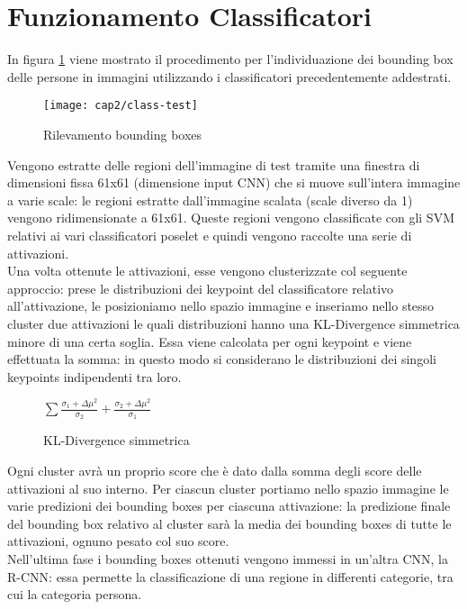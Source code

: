 \section{Funzionamento Classificatori}
In figura \ref{class-test} viene mostrato il procedimento per l'individuazione dei bounding box delle persone in immagini utilizzando i classificatori precedentemente addestrati.

\begin{figure}[h]
\centering
\texttt{[image: cap2/class-test]}
\caption{Rilevamento bounding boxes}
\label{class-test}
\end{figure}

Vengono estratte delle regioni dell'immagine di test tramite una finestra di dimensioni fissa 61x61 (dimensione input CNN) che si muove sull'intera immagine a varie scale: le regioni estratte dall'immagine scalata (scale diverso da 1) vengono ridimensionate a 61x61. Queste regioni vengono classificate con gli SVM relativi ai vari classificatori poselet e quindi vengono raccolte una serie di attivazioni.\\
Una volta ottenute le attivazioni, esse vengono clusterizzate col seguente approccio: prese le distribuzioni dei keypoint del classificatore relativo all'attivazione, le posizioniamo nello spazio immagine e inseriamo nello stesso cluster due attivazioni le quali distribuzioni hanno una KL-Divergence simmetrica minore di una certa soglia. Essa viene calcolata per ogni keypoint e viene effettuata la somma: in questo modo si considerano le distribuzioni dei singoli keypoints indipendenti tra loro.

\begin{figure}[h]
\centering
  $\sum \frac{ \sigma_1 + \Delta \mu ^2}{\sigma_2} + \frac{\sigma_2 + \Delta \mu^2}{\sigma_1} $
  \caption{KL-Divergence simmetrica}
\end{figure}

Ogni cluster avrà un proprio score che è dato dalla somma degli score delle attivazioni al suo interno. Per ciascun cluster portiamo nello spazio immagine le varie predizioni dei bounding boxes per ciascuna attivazione: la predizione finale del bounding box relativo al cluster sarà la media dei bounding boxes di tutte le attivazioni, ognuno pesato col suo score.\\

Nell'ultima fase i bounding boxes ottenuti vengono immessi in un'altra CNN, la R-CNN\cite{r-cnn}: essa permette la classificazione di una regione in differenti categorie, tra cui la categoria persona. 





